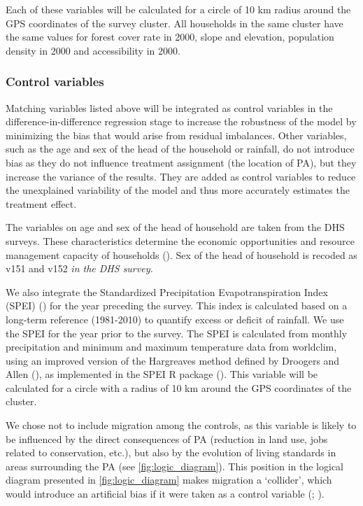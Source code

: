 \documentclass[
]{article}
\begin{document}
Each of these variables will be calculated for a circle of 10 km radius
around the GPS coordinates of the survey cluster. All households in the
same cluster have the same values for forest cover rate in 2000, slope
and elevation, population density in 2000 and accessibility in 2000.

\subsubsection{Control variables}\label{control-variables}

Matching variables listed above will be integrated as control variables
in the difference-in-difference regression stage to increase the
robustness of the model by minimizing the bias that would arise from
residual imbalances. Other variables, such as the age and sex of the
head of the household or rainfall, do not introduce bias as they do not
influence treatment assignment (the location of PA), but they increase
the variance of the results. They are added as control variables to
reduce the unexplained variability of the model and thus more accurately
estimates the treatment effect.

The variables on age and sex of the head of household are taken from the
DHS surveys. These characteristics determine the economic opportunities
and resource management capacity of households
(). Sex of the
head of household is recoded as v151 and v152 \emph{in the DHS survey.}

We also integrate the Standardized Precipitation Evapotranspiration
Index (SPEI)
() for the year preceding the survey. This index is calculated based
on a long-term reference (1981-2010) to quantify excess or deficit of
rainfall. We use the SPEI for the year prior to the survey. The SPEI is
calculated from monthly precipitation and minimum and maximum
temperature data from worldclim, using an improved version of the
Hargreaves method defined by Droogers and Allen
(), as implemented in the
SPEI R package
(). This variable will be calculated for a circle with a radius of
10 km around the GPS coordinates of the cluster.

We chose not to include migration among the controls, as this variable
is likely to be influenced by the direct consequences of PA (reduction
in land use, jobs related to conservation, etc.), but also by the
evolution of living standards in areas surrounding the PA (see
\autoref{fig:logic_diagram}). This position in the logical diagram
presented in \autoref{fig:logic_diagram} makes migration a `collider',
which would introduce an artificial bias if it were taken as a control
variable (; ).
\end{document}
